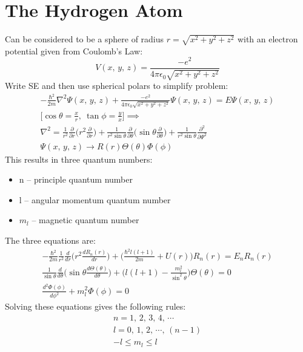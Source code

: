 \documentclass[a4paper, 11pt, fleqn, normalem]{report}
\begin{document}
\section{The Hydrogen Atom}
Can be considered to be a sphere of radius $r = \sqrt{x^2 + y^2 + z^2}$ with an electron potential given from Coulomb's Law:
\begin{equation*}
    V(x,\,y,\,z) = \frac{-e^{2}}{4\pi\epsilon_{0}\sqrt{x^2 + y^2 + z^2}}
\end{equation*}
Write SE and then use spherical polars to simplify problem:
\begin{gather*}
    -\frac{\hbar^{2}}{2m}\nabla^{2}\Psi(x,\,y,\,z) + \frac{-e^{2}}{4\pi\epsilon_{0}\sqrt{x^2 + y^2 + z^2}}\Psi(x,\,y,\,z) = E\Psi(x,\,y,\,z) \\
    \bigg[\cos\theta = \frac{x}{r},~\tan\phi = \frac{y}{x}\bigg] \implies \\
    \nabla^{2} = \frac{1}{r^{2}}\frac{\partial}{\partial r}\Big(r^{2}\frac{\partial}{\partial r}\Big) + \frac{1}{r^{2}\sin\theta}\frac{\partial}{\partial\theta} \Big(\sin\theta \frac{\partial}{\partial\theta}\Big) + \frac{1}{r^{2}\sin\theta}\frac{\partial^{2}}{\partial \Psi^{2}} \\
    \Psi(x,\,y,\,z) \rightarrow R(r)\Theta(\theta)\Phi(\phi)
\end{gather*}
This results in three quantum numbers:
\begin{itemize}
    \item n -- principle quantum number
    \item l -- angular momentum quantum number
    \item $m_{l}$ -- magnetic quantum number
\end{itemize}
The three equations are:
\begin{gather*}
    -\frac{\hbar^{2}}{2m}\frac{1}{r^{2}}\frac{d}{dr}\bigg(r^{2}\frac{dR_{n}(r)}{dr}\bigg) + \bigg(\frac{\hbar^{2}l(l + 1)}{2m} + U(r)\bigg)R_{n}(r) = E_{n}R_{n}(r) \\
    \frac{1}{\sin\theta}\frac{d}{d\theta}\bigg(\sin\theta \frac{d\Theta(\theta)}{d\theta}\bigg) + \bigg(l(l + 1) - \frac{m_{l}^{2}}{\sin^{2}\theta}\bigg)\Theta(\theta) = 0 \\
    \frac{d^{2}\Phi(\phi)}{d\phi^{2}} + m_{l}^{2}\Phi(\phi) = 0
\end{gather*}
Solving these equations gives the following rules:
\begin{gather*}
    n = 1,\,2,\,3,\,4,\, \cdots \\
    l = 0,\,1,\,2,\, \cdots ,\,(n - 1) \\
    -l \leq m_{l} \leq l
\end{gather*}
\end{document}
